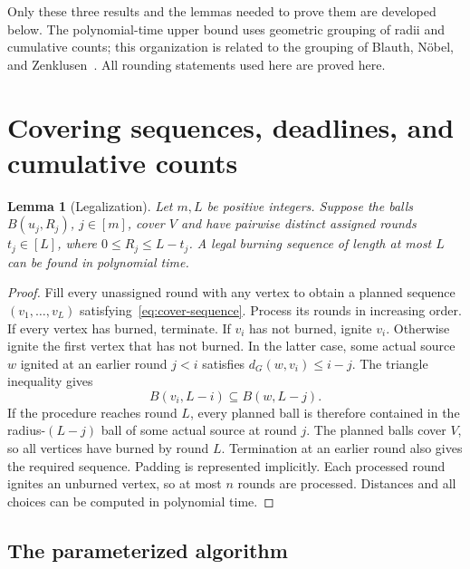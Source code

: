 \documentclass[11pt]{article}
\numberwithin{equation}{section}
\newtheorem{lemma}[theorem]{Lemma}
\theoremstyle{definition}
\begin{document}
Only these three results and the lemmas needed to prove them are developed
below. The polynomial-time upper bound uses geometric grouping of radii
and cumulative counts; this organization is related to the grouping of
Blauth, N\"obel, and Zenklusen~\cite{BNZ}. All rounding statements used
here are proved here.

\section{Covering sequences, deadlines, and cumulative counts}
\label{sec:tools}

\begin{lemma}[Legalization]\label{lem:legalization}
Let $m,L$ be positive integers. Suppose the balls $B(u_j,R_j)$,
$j\in[m]$, cover $V$ and have pairwise distinct assigned rounds
$t_j\in[L]$, where $0\le R_j\le L-t_j$. A legal burning sequence of
length at most $L$ can be found in polynomial time.
\end{lemma}
\begin{proof}
Fill every unassigned round with any vertex to obtain a planned sequence
$(v_1,\ldots,v_L)$ satisfying~\eqref{eq:cover-sequence}. Process its
rounds in increasing order. If every vertex has burned, terminate. If
$v_i$ has not burned, ignite $v_i$. Otherwise ignite the first vertex
that has not burned. In the latter case, some actual source $w$ ignited
at an earlier round $j<i$ satisfies $d_G(w,v_i)\le i-j$.
The triangle inequality gives
\[
 B(v_i,L-i)\subseteq B(w,L-j).
\]
If the procedure reaches round $L$, every planned ball is therefore
contained in the radius-$(L-j)$ ball of some actual source at round $j$.
The planned balls cover $V$, so all vertices have burned by round $L$.
Termination at an earlier round also gives the required sequence.
Padding is represented implicitly. Each processed round ignites an
unburned vertex, so at most $n$ rounds are processed. Distances and
all choices can be computed in polynomial time.
\end{proof}

\subsection{The parameterized algorithm}
\end{document}
